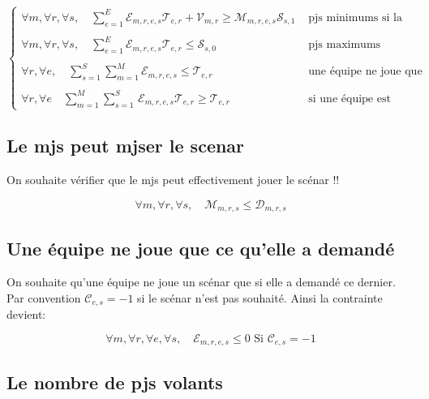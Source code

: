 \documentclass[11pt,a4paper]{article}
\begin{document}
\begin{equation}
	\begin{cases}
	\forall m, \forall r, \forall s, \quad\sum_{e=1}^E \mathcal{E}_{m,r,e,s} \mathcal{T}_{e,r} + \mathcal{V}_{m,r} \geq \mathcal{M}_{m,r,e,s} \mathcal{S}_{s,1} &\text{ pjs minimums si la table est jouée} \\
	\\
	\forall m, \forall r, \forall s,\quad \sum_{e=1}^E \mathcal{E}_{m,r,e,s} \mathcal{T}_{e,r} \leq \mathcal{S}_{s,0} &\text{ pjs maximums}\\
	\\
	\forall r, \forall e, \quad \sum_{s=1}^S  \sum_{m=1}^M \mathcal{E}_{m,r,e,s} \leq \mathcal{T}_{e,r} &\text{ une équipe ne joue que si présente}\\
	\\
	\forall r, \forall e  \quad \sum_{m=1}^M \sum_{s=1}^S \, \mathcal{E}_{m,r,e,s}\mathcal{T}_{e,r} \geq \mathcal{T}_{e,r} &\text{ si une équipe est présente, elle joue}
	\end{cases}
\end{equation}

\subsection*{Le mjs peut mjser le scenar}

On souhaite vérifier que le mjs peut effectivement jouer le scénar !!

\begin{equation}
	\forall m, \forall r, \forall s, \quad \mathcal{M}_{m,r,s} \leq \mathcal{D}_{m,r,s}
\end{equation}

\subsection*{Une équipe ne joue que ce qu'elle a demandé}

On souhaite qu'une équipe ne joue un scénar que si elle a demandé ce dernier. Par convention $\mathcal{C}_{e,s} = -1$ si le scénar n'est pas souhaité. Ainsi la contrainte devient:

\begin{equation}
	\forall m, \forall r, \forall e, \forall s, \quad \mathcal{E}_{m,r,e,s} \leq 0 \text{ Si } \mathcal{C}_{e,s} = -1
\end{equation}

\subsection*{Le nombre de pjs volants}
\end{document}
